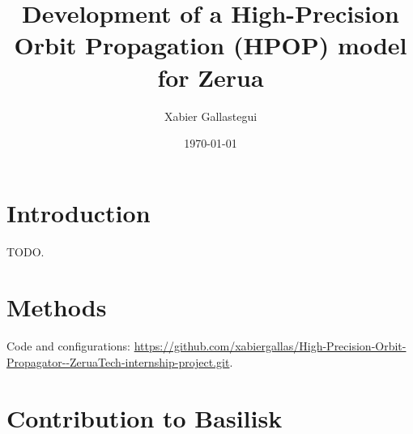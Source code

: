 \documentclass[12pt,a4paper]{report}
\title{Development of a High-Precision Orbit Propagation (HPOP) model for Zerua}
\author{Xabier Gallastegui}
\date{\today}
\begin{document}
\maketitle
\tableofcontents

\chapter{Introduction}
TODO.

\chapter{Methods}
Code and configurations: \url{https://github.com/xabiergallas/High-Precision-Orbit-Propagator--ZeruaTech-internship-project.git}.

\chapter*{Contribution to Basilisk}

\printbibliography
\end{document}
